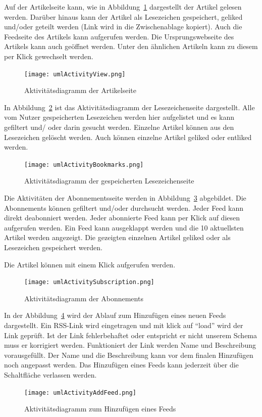 Auf der Artikelseite kann, wie in Abbildung~\ref{fig:umlActivityView.png} dargestellt der Artikel gelesen werden.
Darüber hinaus kann der Artikel als Lesezeichen gespeichert, geliked und/oder geteilt werden (Link wird in die Zwischenablage kopiert).
Auch die Feedseite des Artikels kann aufgerufen werden. Die Ursprungswebseite des Artikels kann auch geöffnet werden.
Unter den ähnlichen Artikeln kann zu diesem per Klick gewechselt werden.
\begin{figure}
    \texttt{[image: umlActivityView.png]}
    \caption{Aktivitätsdiagramm der Artikelseite}
    \label{fig:umlActivityView.png}
\end{figure}


In Abbildung~\ref{fig:umlActivityBookmarks.png} ist das Aktivitätsdiagramm der Lesezeichenseite dargestellt.
Alle vom Nutzer gespeicherten Lesezeichen werden hier aufgelistet und es kann gefiltert und/ oder darin gesucht werden.
Einzelne Artikel können aus den Lesezeichen gelöscht werden. Auch können einzelne Artikel geliked oder entliked werden.
\begin{figure}
    \texttt{[image: umlActivityBookmarks.png]}
    \caption{Aktivitätsdiagramm der gespeicherten Lesezeichenseite}
    \label{fig:umlActivityBookmarks.png}
\end{figure}

Die Aktivitäten der Abonnementsseite werden in Abbildung~\ref{fig:umlActivitySubscription.png} abgebildet.
Die Abonnements können gefiltert und/oder durchsucht werden. Jeder Feed kann direkt deabonniert werden.
Jeder abonnierte Feed kann per Klick auf diesen aufgerufen werden.
Ein Feed kann ausgeklappt werden und die 10 aktuellsten Artikel werden angezeigt.
Die gezeigten einzelnen Artikel geliked oder als Lesezeichen gespeichert werden.

Die Artikel können mit einem Klick aufgerufen werden.
\begin{figure}
    \texttt{[image: umlActivitySubscription.png]}
    \caption{Aktivitätsdiagramm der Abonnements}
    \label{fig:umlActivitySubscription.png}
\end{figure}

In der Abbildung~\ref{fig:umlActivityAddFeed.png} wird der Ablauf zum Hinzufügen eines neuen Feeds dargestellt.
Ein RSS-Link wird eingetragen und mit klick auf \enquote{load} wird der Link geprüft.
Ist der Link fehlerbehaftet oder entspricht er nicht unserem Schema muss er korrigiert werden.
Funktioniert der Link werden Name und Beschreibung vorausgefüllt.
Der Name und die Beschreibung kann vor dem finalen Hinzufügen noch angepasst werden.
Das Hinzufügen eines Feeds kann jederzeit über die Schaltfläche verlassen werden.
\begin{figure}
    \texttt{[image: umlActivityAddFeed.png]}
    \caption{Aktivitätsdiagramm zum Hinzufügen eines Feeds}
    \label{fig:umlActivityAddFeed.png}
\end{figure}

